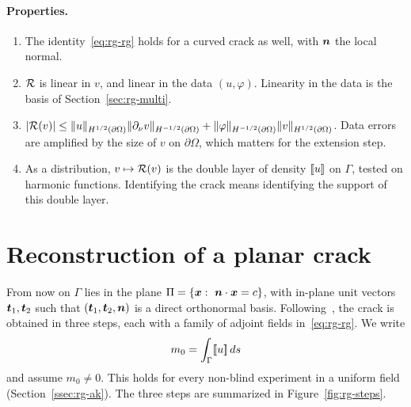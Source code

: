 \paragraph{Properties.}
\begin{enumerate}[label=(\roman*),itemsep=1pt]
\item The identity~\eqref{eq:rg-rg} holds for a curved crack as well, with $\bm{n}$ the local normal.
\item $\mathcal{R}$ is linear in $v$, and linear in the data $(u,\varphi)$. Linearity in the data is the basis of Section~\ref{sec:rg-multi}.
\item $|\mathcal{R}(v)|\le\|u\|_{H^{1/2}(\partial\Omega)}\|\partial_\nu v\|_{H^{-1/2}(\partial\Omega)}+\|\varphi\|_{H^{-1/2}(\partial\Omega)}\|v\|_{H^{1/2}(\partial\Omega)}$. Data errors are amplified by the size of $v$ on $\partial\Omega$, which matters for the extension step.
\item As a distribution, $v\mapsto\mathcal{R}(v)$ is the double layer of density $[\![u]\!]$ on $\Gamma$, tested on harmonic functions. Identifying the crack means identifying the support of this double layer.
\end{enumerate}

\section{Reconstruction of a planar crack}\label{sec:rg-rec}
%
From now on $\Gamma$ lies in the plane $\Pi=\{\vx:\ \vn\cdot\vx=c\}$, with in-plane unit vectors $\bm{t}_1,\bm{t}_2$ such that $(\bm{t}_1,\bm{t}_2,\bm{n})$ is a direct orthonormal basis. Following~\cite{AB96}, the crack is obtained in three steps, each with a family of adjoint fields in~\eqref{eq:rg-rg}. We write
\[
m_0=\int_\Gamma[\![u]\!]\,ds
\]
and assume $m_0\ne0$. This holds for every non-blind experiment in a uniform field (Section~\ref{ssec:rg-ak}). The three steps are summarized in Figure~\ref{fig:rg-steps}.

